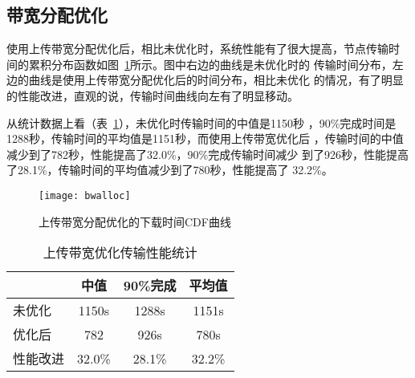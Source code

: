 

\subsection{带宽分配优化}


使用上传带宽分配优化后，相比未优化时，系统性能有了很大提高，节点传输时
间的累积分布函数如图~\ref{fig:bwalloc}所示。图中右边的曲线是未优化时的
传输时间分布，左边的曲线是使用上传带宽分配优化后的时间分布，相比未优化
的情况，有了明显的性能改进，直观的说，传输时间曲线向左有了明显移动。

从统计数据上看（表~\ref{tbl:bwalloc}），未优化时传输时间的中值是1150秒
，90\%完成时间是1288秒，传输时间的平均值是1151秒，而使用上传带宽优化后
，传输时间的中值减少到了782秒，性能提高了32.0\%，90\%完成传输时间减少
到了926秒，性能提高了28.1\%，传输时间的平均值减少到了780秒，性能提高了
32.2\%。

\begin{figure}
  \centering
  \begin{minipage}{0.8\linewidth}
    \centering
    \texttt{[image: bwalloc]}
    \caption{上传带宽分配优化的下载时间CDF曲线}
    \label{fig:bwalloc}
  \end{minipage}
\end{figure}

\begin{table}
\centering
\begin{minipage}{0.8\linewidth}
\centering
\caption{上传带宽优化传输性能统计}
\label{tbl:bwalloc}
\begin{tabular}{lccc}

\toprule[1.5pt]
              & 中值 & 90\%完成 & 平均值\\
\midrule[1pt]
未优化    & 1150s & 1288s & 1151s\\
优化后    & 782   & 926s  & 780s\\
性能改进  & 32.0\% & 28.1\% & 32.2\%\\
\bottomrule[1.5pt]
\end{tabular}
\end{minipage}
\end{table}



